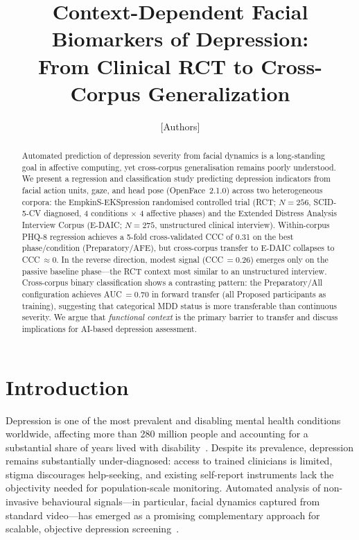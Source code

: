 \documentclass[sigconf]{acmart}
\begin{document}
\title{Context-Dependent Facial Biomarkers of Depression:\\
From Clinical RCT to Cross-Corpus Generalization}

\author{[Authors]}
\affiliation{\institution{[Institution]}}
\email{[email]}

\begin{abstract}
Automated prediction of depression severity from facial dynamics is a long-standing goal
in affective computing, yet cross-corpus generalisation remains poorly understood.
We present a regression and classification study predicting depression indicators from
facial action units, gaze, and head pose (OpenFace~2.1.0) across two heterogeneous
corpora: the EmpkinS-EKSpression randomised controlled trial (RCT; $N=256$,
SCID-5-CV diagnosed, 4 conditions $\times$ 4 affective phases) and the Extended Distress
Analysis Interview Corpus (E-DAIC; $N=275$, unstructured clinical interview).
Within-corpus PHQ-8 regression achieves a 5-fold cross-validated CCC of 0.31 on
the best phase/condition (Preparatory/AFE), but cross-corpus transfer to E-DAIC collapses
to CCC\,$\approx 0$. In the reverse direction, modest signal (CCC\,$= 0.26$) emerges
only on the passive baseline phase---the RCT context most similar to an unstructured
interview. Cross-corpus binary classification shows a contrasting pattern: the
Preparatory/All configuration achieves AUC\,$= 0.70$ in forward transfer
(all Proposed participants as training), suggesting that categorical MDD status is more
transferable than continuous severity. We argue that \emph{functional context} is the
primary barrier to transfer and discuss implications for AI-based depression assessment.
\end{abstract}


\maketitle

\section{Introduction}

Depression is one of the most prevalent and disabling mental health conditions worldwide,
affecting more than 280 million people and accounting for a substantial share of
years lived with disability~\cite{who2023}. Despite its prevalence, depression
remains substantially under-diagnosed: access to trained clinicians is limited,
stigma discourages help-seeking, and existing self-report instruments lack the
objectivity needed for population-scale monitoring. Automated analysis of
non-invasive behavioural signals---in particular, facial dynamics captured from
standard video---has emerged as a promising complementary approach for scalable,
objective depression screening~\cite{cummins2015review,pampouchidou2017automatic}.
\end{document}
